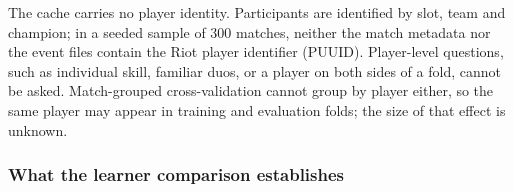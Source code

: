 The cache carries no player identity. Participants are identified by slot, team and champion; in
a seeded sample of 300 matches, neither the match metadata nor the event files contain the Riot
player identifier (PUUID).
Player-level questions, such as individual skill, familiar duos, or a player on both sides of a
fold, cannot be asked. Match-grouped cross-validation cannot group by player either, so the same
player may appear in training and evaluation folds; the size of that effect is unknown.

\subsubsection{What the learner comparison establishes}

